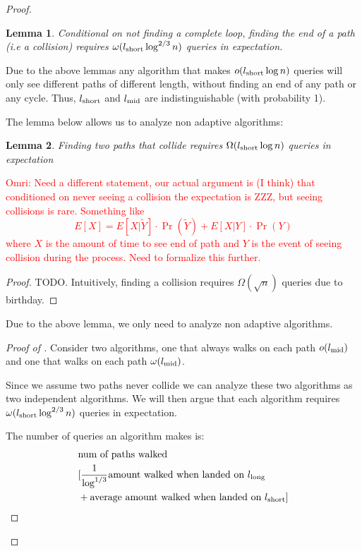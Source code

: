 \documentclass[11pt]{article}
\numberwithin{equation}{section}
\newtheorem{lemma}[lemma]{Lemma}
\newcommand{\1}{\mathbf{1}}
\newcommand\omri[1]{{\textcolor{red}{Omri: #1}}}
\begin{document}
{\begin{proof}
 \begin{lemma} \label{Lemma:NoPathEnd}
 Conditional on not finding a complete loop, finding the end of a path (i.e a collision) requires $\omega(l_{\text{short}} \log^{2/3} n)$ queries in expectation.
 \end{lemma}
 
 
 
Due to the above lemmas any algorithm that makes $o(l_{\text{short}} \log n)$ queries will only see different paths of different length, without finding an end of any path or any cycle. Thus, $l_{\text{short}}$ and $l_{\text{mid}}$ are indistinguishable (with probability 1).
 
 The lemma below allows us to analyze non adaptive algorithms:
\begin{lemma}
Finding two paths that  collide requires $\Omega(l_{\text{short}} \log n)$ queries in expectation
\end{lemma}
\omri{Need a different statement, our actual argument is (I think) that conditioned on never seeing a collision the expectation is ZZZ, but seeing collisions is rare. Something like
$$E[X] = E[X | \tilde Y] \cdot \Pr( \tilde Y) + E[X | Y] \cdot \Pr(Y)$$
where $X$ is the amount of time to see end of path and $Y$ is the event of seeing collision during the process. Need to formalize this further.
}

\begin{proof}
TODO. Intuitively, finding a collision requires $\Omega(\sqrt{n})$ queries due to birthday. 
\end{proof}

Due to the above lemma, we only need to analyze non adaptive algorithms. 
 
 
 \begin{proof}[Proof of ]
 
 Consider two algorithms, one that always walks on each path $o(l_{\text{mid}})$ and one that walks on each path $\omega(l_{\text{mid}})$.
 
Since we assume two paths never collide we can analyze these two algorithms as two independent algorithms. We will then argue that each algorithm requires $\omega(l_{\text{short}} \log^{2/3} n)$ queries in expectation.

The number of queries an algorithm makes is:
\begin{align*}
&\text{num of paths walked} \\&[ \frac{1}{\log^{1/3}} \text{amount walked when landed on $l_{\text{long}}$}\\& + \text{average amount walked when landed on $l_{\text{short}}$}  ]
\end{align*}


\end{proof}
\end{proof}}
\end{document}
